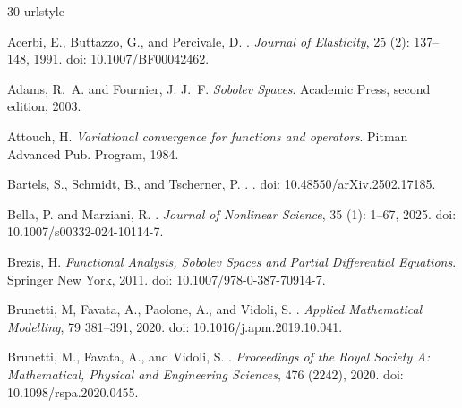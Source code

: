 \documentclass[a4, 11pt, reqno, final]{amsart}
\theoremstyle{plain}%
\begin{document}
	\begin{thebibliography}{30}
		\providecommand{\natexlab}[1]{#1}
		\providecommand{\url}[1]{\texttt{#1}}
		\expandafter\ifx\csname urlstyle\endcsname\relax
		\providecommand{\doi}[1]{doi: #1}\else
		\providecommand{\doi}{doi: \begingroup \urlstyle{rm}\Url}\fi

		Acerbi, E., Buttazzo, G., and Percivale, D.
		.
		\newblock \emph{Journal of Elasticity}, 25 (2): 137--148, 		1991.
		\newblock \doi{10.1007/BF00042462}.

		Adams, R.~A. and Fournier, J. J.~F.
		\newblock \emph{{Sobolev Spaces}}.
		\newblock Academic Press, second edition, 2003.

		Attouch, H.
		\newblock \emph{{Variational convergence for functions and operators}}.
		\newblock Pitman Advanced Pub. Program, 1984.

		Bartels, S., Schmidt, B., and Tscherner, P.
		.
		.
		\newblock \doi{10.48550/arXiv.2502.17185}.

		Bella, P. and Marziani, R.
		.
		\newblock \emph{Journal of Nonlinear Science}, 35 (1): 1--67,
		2025.
		\newblock \doi{10.1007/s00332-024-10114-7}.

		Brezis, H.
		\newblock \emph{{Functional Analysis, Sobolev Spaces and Partial Differential
				Equations}}.
		\newblock Springer New York, 2011.
		\newblock \doi{10.1007/978-0-387-70914-7}.

		Brunetti, M, Favata, A., Paolone, A., and Vidoli, S.
		.
		\newblock \emph{Applied Mathematical Modelling}, 79 381--391, 2020.
		\newblock \doi{10.1016/j.apm.2019.10.041}.


		Brunetti, M., Favata, A., and Vidoli, S.
		.
		\newblock \emph{Proceedings of the Royal Society A: Mathematical, Physical and
			Engineering Sciences}, 476 (2242), 2020.
		\newblock \doi{10.1098/rspa.2020.0455}.


\end{thebibliography}
\end{document}
